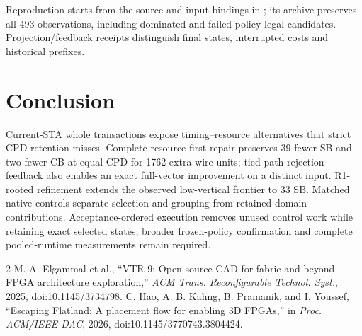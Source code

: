 \documentclass[conference,10pt]{IEEEtran}
\begin{document}
Reproduction starts from the source and input bindings in ; its archive preserves all 493 observations, including dominated and failed-policy legal candidates. Projection/feedback receipts distinguish final states, interrupted costs and historical prefixes.

\section{Conclusion}
Current-STA whole transactions expose timing--resource alternatives that strict CPD retention misses. Complete resource-first repair preserves 39 fewer SB and two fewer CB at equal CPD for 1762 extra wire units; tied-path rejection feedback also enables an exact full-vector improvement on a distinct input. R1-rooted refinement extends the observed low-vertical frontier to 33 SB. Matched native controls separate selection and grouping from retained-domain contributions. Acceptance-ordered execution removes unused control work while retaining exact selected states; broader frozen-policy confirmation and complete pooled-runtime measurements remain required.

\begin{thebibliography}{2}
 M. A. Elgammal et al., ``VTR 9: Open-source CAD for fabric and beyond FPGA architecture exploration,'' \emph{ACM Trans. Reconfigurable Technol. Syst.}, 2025, doi:10.1145/3734798.
 C. Hao, A. B. Kahng, B. Pramanik, and I. Youssef, ``Escaping Flatland: A placement flow for enabling 3D FPGAs,'' in \emph{Proc. ACM/IEEE DAC}, 2026, doi:10.1145/3770743.3804424.
\end{thebibliography}
\end{document}
